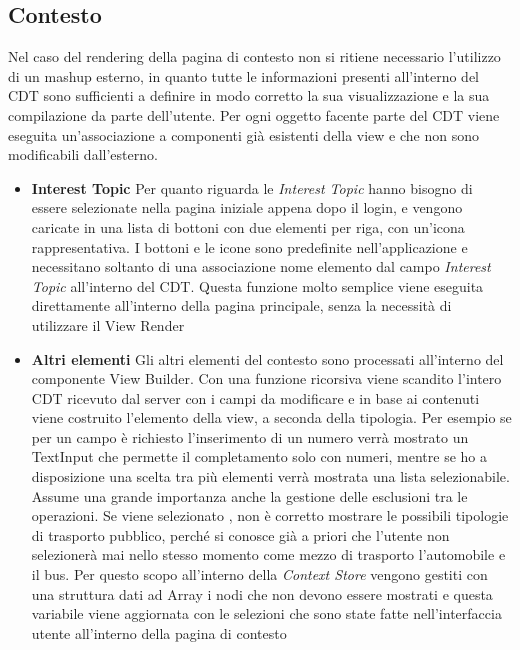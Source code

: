 \subsection{Contesto} 
Nel caso del rendering della pagina di contesto non si ritiene necessario l'utilizzo di un mashup esterno, in quanto tutte le informazioni presenti all'interno del CDT sono sufficienti a definire in modo corretto la sua visualizzazione e la sua compilazione da parte dell'utente.
	Per ogni oggetto facente parte del CDT viene eseguita un'associazione a componenti già esistenti della view e che non sono modificabili dall'esterno.
	\begin{itemize}
		\item \textbf{Interest Topic} Per quanto riguarda le \emph{Interest Topic} hanno bisogno di essere selezionate nella pagina iniziale appena dopo il login, e vengono caricate in una lista di bottoni con due elementi per riga, con un'icona rappresentativa. I bottoni e le icone sono predefinite nell'applicazione e necessitano soltanto di una associazione nome elemento dal campo \emph{Interest Topic} all'interno del CDT. Questa funzione molto semplice viene eseguita direttamente all'interno della pagina principale, senza la necessità di utilizzare il View Render
		\item \textbf{Altri elementi} Gli altri elementi del contesto sono processati all'interno del componente View Builder. Con una funzione ricorsiva viene scandito l'intero CDT ricevuto dal server con i campi da modificare e in base ai contenuti viene costruito l'elemento della view, a seconda della tipologia. Per esempio se per un campo è richiesto l'inserimento di un numero verrà mostrato un TextInput che permette il completamento solo con numeri, mentre se ho a disposizione una scelta tra più elementi verrà mostrata una lista selezionabile.
		Assume una grande importanza anche la gestione delle esclusioni tra le operazioni. Se viene selezionato , non è corretto mostrare le possibili tipologie di trasporto pubblico, perché si conosce già a priori che l'utente non selezionerà mai nello stesso momento come mezzo di trasporto l'automobile e il bus. Per questo scopo all'interno della \emph{Context Store} vengono gestiti con una struttura dati ad Array i nodi che non devono essere mostrati e questa variabile viene aggiornata con le selezioni che sono state fatte nell'interfaccia utente all'interno della pagina di contesto
	\end{itemize}
	
